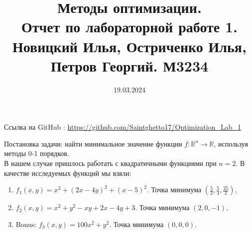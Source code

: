 \documentclass[12pt]{article}
\title{Методы оптимизации.\\ Отчет по лабораторной работе 1. \\Новицкий Илья, Остриченко Илья, Петров Георгий. М3234}
\date{19.03.2024}
\begin{document}
\maketitle

Ссылка на GitHub : \url{https://github.com/Saintghetto17/Optimization_Lab_1}

\large{Постановка задачи:} найти минимальное значение функции $f : \mathbb{R}^n  \rightarrow \mathbb{R}$, используя  методы 0-1 порядков. \\
В нашем случае пришлось работать с квадратичными функциями при $n = 2$. В качестве исследуемых функций мы взяли:
\begingroup
\renewcommand\labelenumi{(\theenumi)}
\begin{enumerate}
\item  $f_{1}(x, y) = x ^ 2+ (2x - 4y)^2 + (x-5)^2$. Точка минимума $(\frac{5}{2}, \frac{5}{4}, \frac{25}{2})$, \label{item:1}
\item $f_{2}(x, y) = x^2 + y^2 -xy + 2x - 4y + 3$. Точка минимума $(2, 0, -1), $ 
\item Bonus: $f_{3}(x, y) = 100x^2 + y^2$. Точка минимума $(0, 0, 0).$  
\label{item:2}
\end{enumerate}
\endgroup
\end{document}

